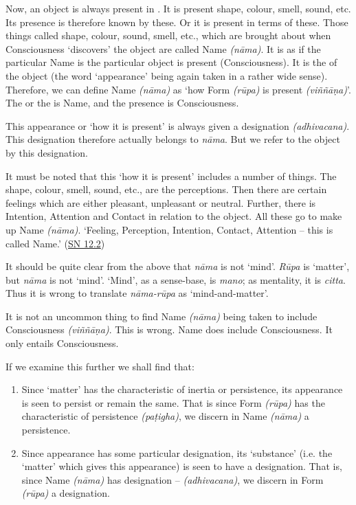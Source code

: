 Now, an object is always present in . It is present  shape, colour, smell, sound, etc. Its presence is therefore known by these. Or it is present in terms of these. Those things called shape, colour, sound, smell, etc., which are brought about when Consciousness `discovers' the object are called Name \emph{(nāma)}. It is as if the particular Name is  the particular object is present (Consciousness). It is the  of the object (the word `appearance' being again taken in a rather wide sense). Therefore, we can define Name \emph{(nāma)} as `how Form \emph{(rūpa)} is present \emph{(viññāṇa)}'. The  or the  is Name, and the presence is Consciousness.

This appearance or `how it is present' is always given a designation \emph{(adhivacana)}. This designation therefore actually belongs to \emph{nāma}. But we refer to the object by this designation.

It must be noted that this `how it is present' includes a number of things. The shape, colour, smell, sound, etc., are the perceptions. Then there are certain feelings which are either pleasant, unpleasant or neutral. Further, there is Intention, Attention and Contact in relation to the object. All these go to make up Name \emph{(nāma)}. `Feeling, Perception, Intention, Contact, Attention -- this is called Name.' (\href{https://suttacentral.net/sn12.2/en/bodhi}{SN 12.2})

It should be quite clear from the above that \emph{nāma} is not `mind'. \emph{Rūpa} is `matter', but \emph{nāma} is not `mind'. `Mind', as a sense-base, is \emph{mano}; as mentality, it is \emph{citta}. Thus it is wrong to translate \emph{nāma-rūpa} as `mind-and-matter'.

It is not an uncommon thing to find Name \emph{(nāma)} being taken to include Consciousness \emph{(viññāṇa)}. This is wrong. Name does  include Consciousness. It only entails Consciousness.

If we examine this further we shall find that:

\vspace*{-5pt}
\enlargethispage*{\baselineskip}

\begin{enumerate}
\item Since `matter' has the characteristic of inertia or persistence, its appearance is seen to persist or remain the same. That is since Form \emph{(rūpa)} has the characteristic of persistence \emph{(paṭigha)}, we discern in Name \emph{(nāma)} a persistence.

\item Since appearance has some particular designation, its `substance' (i.e. the `matter' which gives this appearance) is seen to have a designation. That is, since Name \emph{(nāma)} has designation -- \emph{(adhivacana)}, we discern in Form \emph{(rūpa)} a designation.
\end{enumerate}


